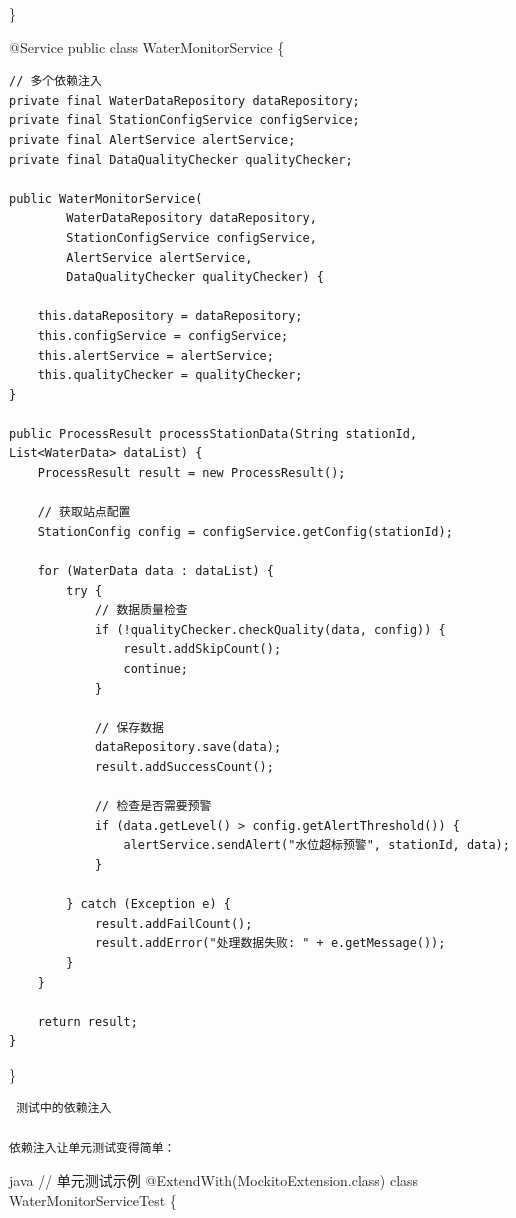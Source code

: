 \}

@Service public class WaterMonitorService \{

\begin{verbatim}
// 多个依赖注入
private final WaterDataRepository dataRepository;
private final StationConfigService configService;
private final AlertService alertService;
private final DataQualityChecker qualityChecker;

public WaterMonitorService(
        WaterDataRepository dataRepository,
        StationConfigService configService,
        AlertService alertService,
        DataQualityChecker qualityChecker) {
    
    this.dataRepository = dataRepository;
    this.configService = configService;
    this.alertService = alertService;
    this.qualityChecker = qualityChecker;
}

public ProcessResult processStationData(String stationId, List<WaterData> dataList) {
    ProcessResult result = new ProcessResult();
    
    // 获取站点配置
    StationConfig config = configService.getConfig(stationId);
    
    for (WaterData data : dataList) {
        try {
            // 数据质量检查
            if (!qualityChecker.checkQuality(data, config)) {
                result.addSkipCount();
                continue;
            }
            
            // 保存数据
            dataRepository.save(data);
            result.addSuccessCount();
            
            // 检查是否需要预警
            if (data.getLevel() > config.getAlertThreshold()) {
                alertService.sendAlert("水位超标预警", stationId, data);
            }
            
        } catch (Exception e) {
            result.addFailCount();
            result.addError("处理数据失败: " + e.getMessage());
        }
    }
    
    return result;
}
\end{verbatim}

\}

\begin{lstlisting}
 测试中的依赖注入

依赖注入让单元测试变得简单：
\end{lstlisting}

java // 单元测试示例 @ExtendWith(MockitoExtension.class) class WaterMonitorServiceTest \{

